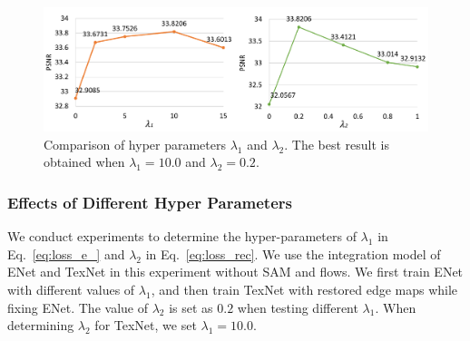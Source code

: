 \begin{figure}[t]
	\centering
	\includegraphics[width=1.0\columnwidth]{lamda1} %
	\caption{Comparison of hyper parameters $\lambda_1$ and $\lambda_2$. The best result is obtained when $\lambda_1=10.0$ and $\lambda_2=0.2$.}
	\label{fig:hparam}
\end{figure}




 


\subsubsection{Effects of Different Hyper Parameters}
We conduct experiments to determine the hyper-parameters of $\lambda_1$ in Eq.~\eqref{eq:loss_e_} and $\lambda_2$ in Eq.~\eqref{eq:loss_rec}. 
We use the integration model of ENet and TexNet in this experiment without SAM and flows.
We first train ENet with different values of $\lambda_1$, and then train TexNet with restored edge maps while fixing ENet. The value of $\lambda_2$ is set as $0.2$ when testing different $\lambda_1$.
When determining $\lambda_2$ for TexNet, we set $\lambda_1=10.0$.

